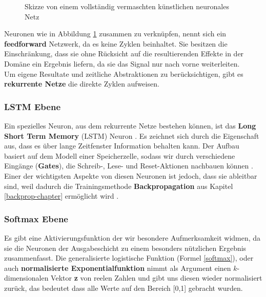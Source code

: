 \begin{figure} [H]
                \caption{Skizze von einem vollständig vermaschten künstlichen neuronales Netz \label{fig:nntikz}}
            \end{figure}
            \noindent
            Neuronen wie in Abbildung \ref{fig:nntikz} zusammen zu verknüpfen, nennt sich ein \textbf{feedforward} Netzwerk, da es keine Zyklen beinhaltet. Sie besitzen die Einschränkung, dass sie ohne Rücksicht auf die resultierenden Effekte in der Domäne ein Ergebnis liefern, da sie das Signal nur nach vorne weiterleiten.\\

            \noindent
            Um eigene Resultate und zeitliche Abstraktionen zu berücksichtigen, gibt es \textbf{rekurrente Netze} die direkte Zyklen aufweisen.

            \subsubsection*{LSTM Ebene} \label{lstm-definition}
                Ein spezielles Neuron, aus dem rekurrente Netze bestehen können, ist das \textbf{Long Short Term Memory} (LSTM) Neuron \cite{lstm}. Es zeichnet sich durch die Eigenschaft aus, dass es über lange Zeitfenster Information behalten kann. Der Aufbau basiert auf dem Modell einer Speicherzelle, sodass wir durch verschiedene Eingänge (\textbf{Gates}), die Schreib-, Lese- und Reset-Aktionen nachbauen können \cite{lstm-new}. Einer der wichtigsten Aspekte von diesen Neuronen ist jedoch, dass sie ableitbar sind, weil dadurch die Trainingsmethode \textbf{Backpropagation} aus Kapitel \ref{backprop-chapter} ermöglicht wird \cite{backprop}.

            \subsubsection*{Softmax Ebene} \label{softmax-definition}
                Es gibt eine Aktivierungsfunktion der wir besondere Aufmerksamkeit widmen, da sie die Neuronen der Ausgabeschicht zu einem besonders nützlichen Ergebnis zusammenfasst. Die generalisierte logistische Funktion (Formel \ref{softmax}), oder auch \textbf{normalisierte Exponentialfunktion} nimmt als Argument einen $k$-dimensionalen Vektor \textbf{z} von reelen Zahlen und gibt uns diesen wieder normalisiert zurück, das bedeutet dass alle Werte auf den Bereich [0,1] gebracht wurden.

